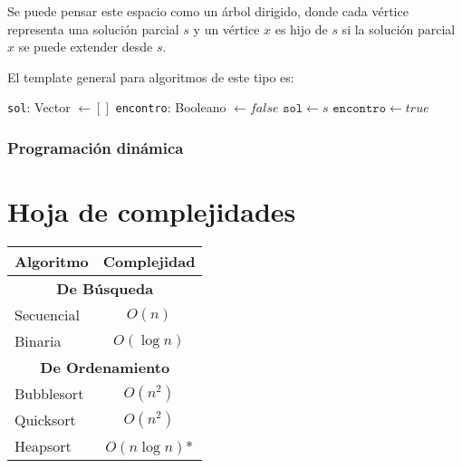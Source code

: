 Se puede pensar este espacio como un árbol dirigido, donde cada vértice representa una solución parcial \(s\) y un vértice \(x\) es hijo de \(s\) si la solución parcial \(x\) se puede extender desde \(s\). 

El template general para algoritmos de este tipo es: 

\begin{algorithmic}
	\State \texttt{sol}: Vector \(\gets [] \)
	\State \texttt{encontro}: Booleano \(\gets false \)
	\State\(\texttt{sol} \gets s\)
	\State \(\texttt{encontro} \gets true\)
	\Else
			~\Return
			\EndIf
		\EndFor
	\EndIf
	\EndFunction
\end{algorithmic}

\subsubsection{Programación dinámica}

\printbibliography[keyword=intro,title={Bibliografía}]


\newpage
\appendix
\section{Hoja de complejidades}
\begin{center}
\begin{tabular}{|l|c|}
	\hline
	\textbf{Algoritmo} & \textbf{Complejidad} \\
	\hline
	\multicolumn{2}{|c|}{\cellcolor{blue!25}\textbf{De Búsqueda}}\\
	\hline
	Secuencial & \(O(n)\) \\
	\hline
	Binaria & \(O(\log{n})\) \\
	\hline
	\multicolumn{2}{|c|}{\cellcolor{blue!25}\textbf{De Ordenamiento}}\\
	\hline
	Bubblesort & \(O(n^2)\) \\
	\hline
	Quicksort & \(O(n^2)\) \\
	\hline
	Heapsort & \(O(n\log{n})\)* \\
	\hline
\end{tabular}
\end{center}

